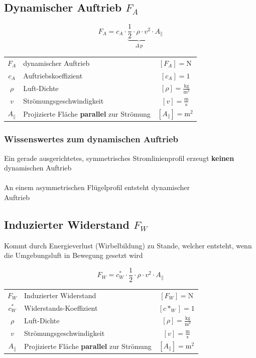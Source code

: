 


\subsection{Dynamischer Auftrieb $F_A$}

$$ \boxed{ F_A = c_A \cdot  \underbrace{\frac{1}{2} \cdot \rho \cdot v^2 }_{\substack{\Delta \, p}} \cdot A_{\|}	} $$


\begin{tabular}{c l c}
		$F_A$ & dynamischer Auftrieb & $[F_A] = \mathrm{N}$ \\
		$c_A$ & Auftriebskoeffizient & $[c_A] = 1$ \\
		\rule{0pt}{8pt}$\rho$ & Luft-Dichte & $[\rho] = \mathrm{\frac{kg}{m^3}}$ \\
		\rule{0pt}{8pt}$v$ & Strömungsgeschwindigkeit & $[v] = \mathrm{\frac{m}{s}}$ \\
		$A_{\|}$ & Projizierte Fläche \textbf{parallel} zur Strömung & $[A_{\|}] = \mathrm{m^2}$ \\
\end{tabular}




\subsubsection{Wissenswertes zum dynamischen Auftrieb}
Ein gerade ausgerichtetes, symmetrisches Stromlinienprofil erzeugt \textbf{keinen} dynamischen Auftrieb \\
\\
An einem asymmetrischen Flügelprofil entsteht dynamischer\\
Auftrieb 


\subsection{Induzierter Widerstand $F_W$}
Kommt durch Energieverlust (Wirbelbildung) zu Stande, welcher entsteht, wenn die Umgebungsluft in Bewegung gesetzt wird

$$ \boxed{ F_W = c^*_W \cdot \frac{1}{2} \cdot \rho \cdot v^2 \cdot A_{\|} } $$


\begin{tabular}{c l c}
		$F_W$ & Induzierter Widerstand & $[F_W] = \mathrm{N}$ \\
		$c^*_W$ & Widerstands-Koeffizient & $[c*_W] = 1$ \\
		\rule{0pt}{8pt}$\rho$ & Luft-Dichte & $[\rho] = \mathrm{\frac{kg}{m^3}}$ \\
		\rule{0pt}{8pt}$v$ & Strömungsgeschwindigkeit & $[v] = \mathrm{\frac{m}{s}}$ \\
		$A_{\|}$ & Projizierte Fläche \textbf{parallel} zur Strömung & $[A_{\|}] = \mathrm{m^2}$ \\
\end{tabular}


